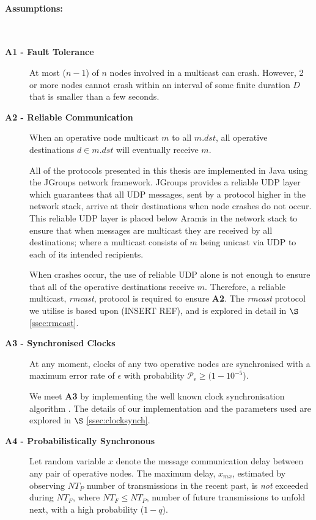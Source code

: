 	\paragraph{Assumptions:}\hspace{0pt} \\
	\begin{description}
	
		\item [\textbf{A1 - Fault Tolerance}] At most ($n-1$) of $n$ nodes involved in a multicast can crash. However, 2 or more nodes cannot crash within an interval of some finite duration $D$ that is smaller than a few seconds.
		
		\item [\textbf{A2 - Reliable Communication}] When an operative node multicast $m$ to all $m.dst$, all operative destinations $d \in m.dst$ will eventually receive $m$.
		
		All of the protocols presented in this thesis are implemented in Java using the JGroups \citep{JGroups} network framework.  JGroups provides a reliable UDP layer which guarantees that all UDP messages, sent by a protocol higher in the network stack, arrive at their destinations when node crashes do not occur.  This reliable UDP layer is placed below \textsf{Aramis} in the network stack to ensure that when messages are multicast they are received by all destinations; where a multicast consists of $m$ being unicast via UDP to each of its intended recipients.  
		
		When crashes occur, the use of reliable UDP alone is not enough to ensure that all of the operative destinations receive $m$.  Therefore, a reliable multicast, \emph{rmcast}, protocol is required to ensure \textbf{A2}.  The \emph{rmcast} protocol we utilise is based upon (INSERT REF), and is explored in detail in $\S$ \ref{ssec:rmcast}.  
		
		\item [\textbf{A3 - Synchronised Clocks}] At any moment, clocks of any two operative nodes are synchronised with a maximum error rate of $\epsilon$ with probability $\mathcal{P}_\epsilon \geq (1- 10^{-5}$).

        We meet \textbf{A3} by implementing the well known clock synchronisation algorithm \citep{Cristian:1996:SA:227210.227231}.  The details of our implementation and the parameters used are explored in $\S$ \ref{ssec:clocksynch}.
		
		\item [\textbf{A4 - Probabilistically Synchronous}] Let random variable $x$ denote the message communication delay between any pair of operative nodes. The maximum delay, $x_{mx}$, estimated by observing $NT_P$ number of transmissions in the recent past, is \emph{not} exceeded during $NT_F$, where $NT_F \leq NT_P$, number of future transmissions to unfold next, with a high probability ($1-q$).
		

\end{description}
